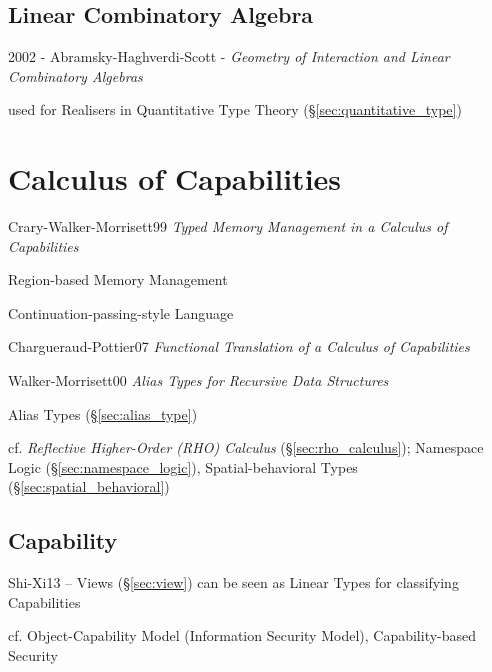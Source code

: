 \subsection{Linear Combinatory Algebra}\label{sec:linear_combinatory_algebra}

2002 - Abramsky-Haghverdi-Scott - \emph{Geometry of Interaction and Linear
  Combinatory Algebras}

used for Realisers in Quantitative Type Theory
(\S\ref{sec:quantitative_type})



\section{Calculus of Capabilities}\label{sec:capabilities_calculus}

Crary-Walker-Morrisett99 \emph{Typed Memory Management in a Calculus
  of Capabilities}

Region-based Memory Management

Continuation-passing-style Language

Chargueraud-Pottier07 \emph{Functional Translation of a Calculus of
  Capabilities}

Walker-Morrisett00 \emph{Alias Types for Recursive Data Structures}

Alias Types (\S\ref{sec:alias_type})

cf. \emph{Reflective Higher-Order (RHO) Calculus} (\S\ref{sec:rho_calculus});
Namespace Logic (\S\ref{sec:namespace_logic}), Spatial-behavioral Types
(\S\ref{sec:spatial_behavioral})



\subsection{Capability}\label{sec:capability}

Shi-Xi13 -- Views (\S\ref{sec:view}) can be seen as Linear Types for
classifying Capabilities

cf. Object-Capability Model (Information Security Model), Capability-based
Security

